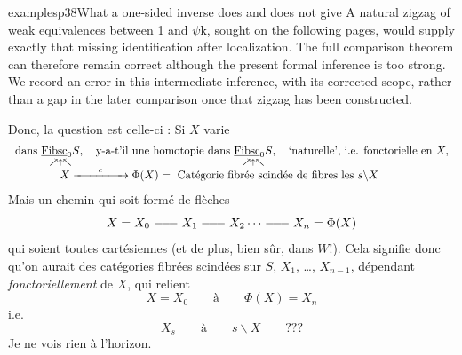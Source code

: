 \begin{dcomment}{examples}{p38}{What a one-sided inverse does and does not give}
A natural zigzag of weak equivalences between 1 and \ensuremath{\psi}k, sought on the following pages, would supply exactly that missing identification after localization. The full comparison theorem can therefore remain correct although the present formal inference is too strong. We record an error in this intermediate inference, with its corrected scope, rather than a gap in the later comparison once that zigzag has been constructed.

\end{dcomment}


Donc, la question est celle-ci : Si $X$ varie
\[
\begin{array}{l}
\text{dans } \underset{\nearrow\uparrow\nwarrow}{\underline{\mathrm{Fibsc}}_0 S}, \quad \text{y-a-t'il une homotopie dans } \underset{\nearrow\uparrow\nwarrow}{\underline{\mathrm{Fibsc}}_0 S}, \quad \text{`naturelle', i.e. fonctorielle en } X, \\[2ex]
\qquad\qquad X \xrightarrow{\qquad c \qquad} \Phi(X) = \ \text{Catégorie fibrée scindée de fibres les } s\backslash X
\end{array}
\]
Mais un chemin qui soit formé de flèches
\[
X = X_0 \lline X_1 \lline X_2 \cdots \lline X_n = \Phi(X)
\]
qui soient toutes cartésiennes (et de plus, bien sûr, dans $W$!). Cela signifie donc qu'on aurait des catégories fibrées scindées sur $S$, $X_1$, \dots, $X_{n-1}$, dépendant \textit{fonctoriellement} de $X$, qui relient
\[
X = X_0 \qquad \text{à} \qquad \Phi(X) = X_n
\]
i.e.
\[
X_s \qquad \text{à} \qquad s\backslash X \qquad \text{???}
\]
Je ne vois rien à l'horizon.



